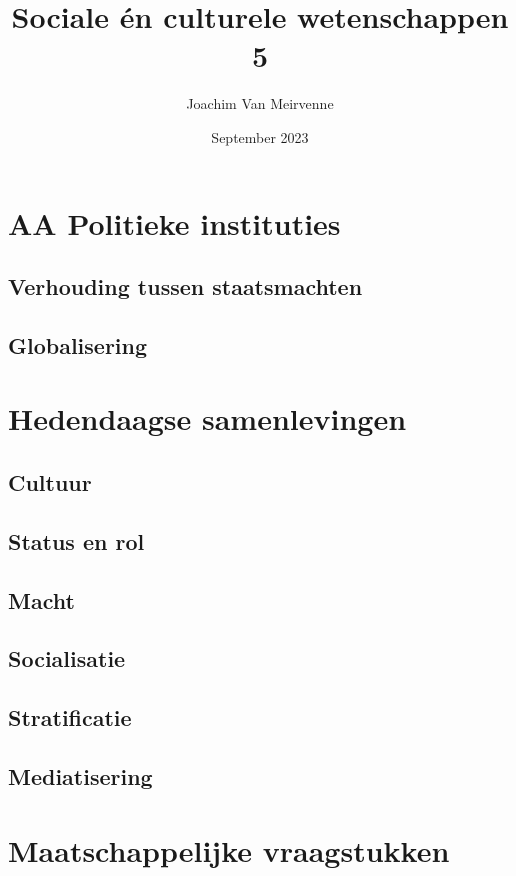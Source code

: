 \documentclass[a4paper,12pt, dutch, oneside ]{book}
\begin{document}
\author{Joachim Van Meirvenne}
\title{Sociale \'en culturele wetenschappen 5}
\date{September 2023}



\part{AA Politieke instituties}


\chapter{Verhouding tussen staatsmachten}
\chapter{Globalisering}

\part{Hedendaagse samenlevingen}
\chapter{Cultuur}
\chapter{Status en rol}
\chapter{Macht}
\chapter{Socialisatie}
\chapter{Stratificatie}
\chapter{Mediatisering}

\part{Maatschappelijke vraagstukken}

%


\end{document}
